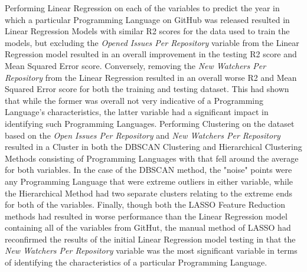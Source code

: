 \documentclass{article}
\theoremstyle{theorem}
\theoremstyle{definition}
\theoremstyle{remark}
\begin{document}
\indent Performing Linear Regression on each of the variables to predict the year in which a particular Programming Language on GitHub was released resulted in Linear Regression Models with similar R2 scores for the data used to train the models, but excluding the \textit{Opened Issues Per Repository} variable from the Linear Regression model resulted in an overall improvement in the testing R2 score and Mean Squared Error score. Conversely, removing the \textit{New Watchers Per Repository} from the Linear Regression resulted in an overall worse R2 and Mean Squared Error score for both the training and testing dataset. This had shown that while the former was overall not very indicative of a Programming Language's characteristics, the latter variable had a significant impact in identifying such Programming Languages. Performing Clustering on the dataset based on the \textit{Open Issues Per Repository} and \textit{New Watchers Per Repository} resulted in a Cluster in both the DBSCAN Clustering and Hierarchical Clustering Methods consisting of Programming Languages with that fell around the average for both variables. In the case of the DBSCAN method, the "noise" points were any Programming Language that were extreme outliers in either variable, while the Hierarchical Method had two separate clusters relating to the extreme ends for both of the variables. Finally, though both the LASSO Feature Reduction methods had resulted in worse performance than the Linear Regression model containing all of the variables from GitHut, the manual method of LASSO had reconfirmed the results of the initial Linear Regression model testing in that the \textit{New Watchers Per Repository} variable was the most significant variable in terms of identifying the characteristics of a particular Programming Language.
\end{document}
